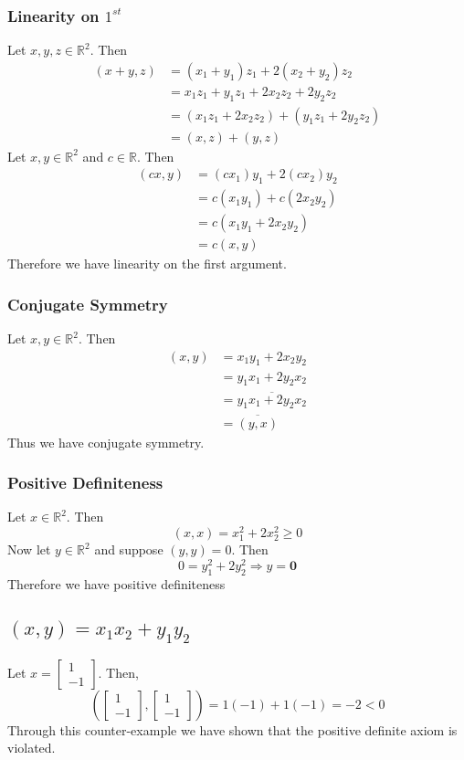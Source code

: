 \documentclass{article}
\begin{document}
\subsubsection*{Linearity on $1^{st}$}
Let $x, y, z \in \mathbb{R}^2$. Then \begin{align*} (x+y, z) &= (x_1 + y_1)z_1 + 2(x_2 + y_2)z_2 \\
& = x_1z_1 + y_1z_1 + 2x_2z_2 + 2y_2z_2 \\
& = (x_1z_1 + 2x_2z_2) + (y_1z_1 + 2y_2z_2) \\
& = (x,z) + (y,z)
\end{align*}
Let $x, y \in \mathbb{R}^2$ and $c \in \mathbb{R}$. Then
\begin{align*} (cx,y) &= (cx_1)y_1 + 2(cx_2)y_2 \\
& = c(x_1y_1) + c(2x_2y_2) \\
& =  c(x_1y_1 + 2x_2y_2) \\
& = c(x,y)
\end{align*}
Therefore we have linearity on the first argument.
\subsubsection*{Conjugate Symmetry}
Let $x, y \in \mathbb{R}^2$. Then
\begin{align*}
(x,y) &= x_1y_1 + 2x_2y_2 \\
& = y_1x_1 + 2y_2x_2 \\
& =\overline{ y_1x_1 + 2y_2x_2} \\
& = \overline{(y,x)}
\end{align*}
Thus we have conjugate symmetry.
\subsubsection*{Positive Definiteness}
Let $x \in \mathbb{R}^2$. Then
\[ (x,x) = x_1^2 + 2x_2^2 \geqslant 0 \]
 Now let $y \in \mathbb{R}^2$ and suppose $(y,y) = 0$. Then
\[ 0 = y_1^2 + 2y_2^2 \Longrightarrow y = \mathbf{0} \] Therefore we have positive definiteness

\subsection{$(x,y) = x_1x_2 + y_1y_2$}
Let $x = \begin{bmatrix}1\\-1\end{bmatrix}$. Then,
\[ \left( \begin{bmatrix}1\\-1\end{bmatrix}, \begin{bmatrix}1\\-1\end{bmatrix}\right) = 1(-1) + 1(-1) = -2 < 0 \] Through this counter-example we have shown that the positive definite axiom is violated.
\end{document}
